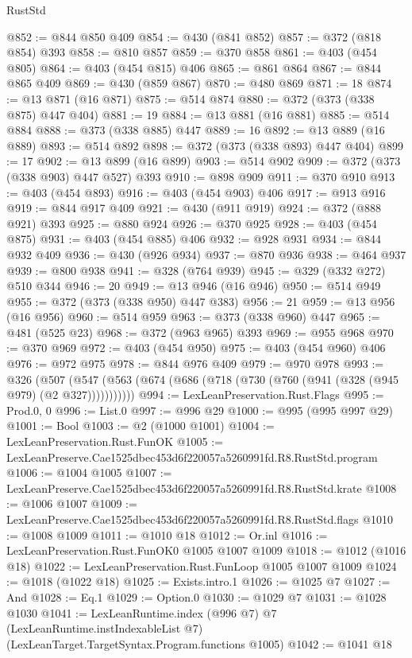 \begin{lexlean}{RustStd}
\begin{coremodule}
@852 := @844 @850 @409
@854 := @430 (@841 @852)
@857 := @372 (@818 @854) @393
@858 := @810 @857
@859 := @370 @858
@861 := @403 (@454 @805)
@864 := @403 (@454 @815) @406
@865 := @861 @864
@867 := @844 @865 @409
@869 := @430 (@859 @867)
@870 := @480 @869
@871 := 18
@874 := @13 @871 (@16 @871)
@875 := @514 @874
@880 := @372 (@373 (@338 @875) @447 @404)
@881 := 19
@884 := @13 @881 (@16 @881)
@885 := @514 @884
@888 := @373 (@338 @885) @447
@889 := 16
@892 := @13 @889 (@16 @889)
@893 := @514 @892
@898 := @372 (@373 (@338 @893) @447 @404)
@899 := 17
@902 := @13 @899 (@16 @899)
@903 := @514 @902
@909 := @372 (@373 (@338 @903) @447 @527) @393
@910 := @898 @909
@911 := @370 @910
@913 := @403 (@454 @893)
@916 := @403 (@454 @903) @406
@917 := @913 @916
@919 := @844 @917 @409
@921 := @430 (@911 @919)
@924 := @372 (@888 @921) @393
@925 := @880 @924
@926 := @370 @925
@928 := @403 (@454 @875)
@931 := @403 (@454 @885) @406
@932 := @928 @931
@934 := @844 @932 @409
@936 := @430 (@926 @934)
@937 := @870 @936
@938 := @464 @937
@939 := @800 @938
@941 := @328 (@764 @939)
@945 := @329 (@332 @272) @510 @344
@946 := 20
@949 := @13 @946 (@16 @946)
@950 := @514 @949
@955 := @372 (@373 (@338 @950) @447 @383)
@956 := 21
@959 := @13 @956 (@16 @956)
@960 := @514 @959
@963 := @373 (@338 @960) @447
@965 := @481 (@525 @23)
@968 := @372 (@963 @965) @393
@969 := @955 @968
@970 := @370 @969
@972 := @403 (@454 @950)
@975 := @403 (@454 @960) @406
@976 := @972 @975
@978 := @844 @976 @409
@979 := @970 @978
@993 := @326
    (@507 (@547 (@563 (@674 (@686 (@718 (@730 (@760 (@941 (@328 (@945 @979) (@2 @327)))))))))))
@994 := LexLeanPreservation.Rust.Flags
@995 := Prod.{0, 0}
@996 := List.{0}
@997 := @996 @29
@1000 := @995 (@995 @997 @29)
@1001 := Bool
@1003 := @2 (@1000 @1001)
@1004 := LexLeanPreservation.Rust.FunOK
@1005 := LexLeanPreserve.Cae1525dbec453d6f220057a5260991fd.R8.RustStd.program
@1006 := @1004 @1005
@1007 := LexLeanPreserve.Cae1525dbec453d6f220057a5260991fd.R8.RustStd.krate
@1008 := @1006 @1007
@1009 := LexLeanPreserve.Cae1525dbec453d6f220057a5260991fd.R8.RustStd.flags
@1010 := @1008 @1009
@1011 := @1010 @18
@1012 := Or.inl
@1016 := LexLeanPreservation.Rust.FunOK0 @1005 @1007 @1009
@1018 := @1012 (@1016 @18)
@1022 := LexLeanPreservation.Rust.FunLoop @1005 @1007 @1009
@1024 := @1018 (@1022 @18)
@1025 := Exists.intro.{1}
@1026 := @1025 @7
@1027 := And
@1028 := Eq.{1}
@1029 := Option.{0}
@1030 := @1029 @7
@1031 := @1028 @1030
@1041 := LexLeanRuntime.index
    (@996 @7)
    @7
    (LexLeanRuntime.instIndexableList @7)
    (LexLeanTarget.TargetSyntax.Program.functions @1005)
@1042 := @1041 @18

\end{coremodule}
\end{lexlean}
